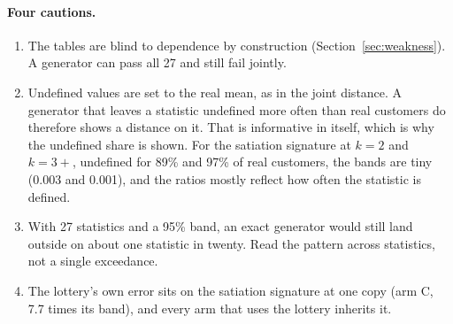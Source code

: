 \documentclass[11pt]{article}
\begin{document}
\paragraph{Four cautions.}
\begin{enumerate}
\item The tables are blind to dependence by construction
  (Section~\ref{sec:weakness}). A generator can pass all 27 and still fail
  jointly.
\item Undefined values are set to the real mean, as in the joint distance. A
  generator that leaves a statistic undefined more often than real customers do
  therefore shows a distance on it. That is informative in itself, which is why
  the undefined share is shown. For the satiation signature at $k = 2$ and
  $k = 3{+}$, undefined for 89\% and 97\% of real customers, the bands are
  tiny (0.003 and 0.001), and the ratios mostly reflect how often the statistic
  is defined.
\item With 27 statistics and a 95\% band, an exact generator would still land
  outside on about one statistic in twenty. Read the pattern across statistics,
  not a single exceedance.
\item The lottery's own error sits on the satiation signature at one copy
  (arm C, 7.7 times its band), and every arm that uses the lottery inherits it.
\end{enumerate}

\end{document}
